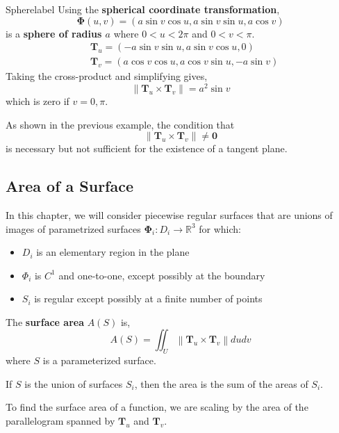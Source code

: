 \begin{ex}{Sphere}{label}
	Using the \textbf{spherical coordinate transformation},
	\[\mathbf{\Phi}(u, v) = (a \sin v \cos u, a \sin v \sin u, a \cos v)\]
	is a \textbf{sphere of radius $a$} where $0 < u < 2 \pi$ and $0 < v < \pi$.
	\begin{align*}
		&\mathbf{T}_u=(-a \sin v \sin u, a \sin v \cos u, 0) \\
		&\mathbf{T}_v=(a \cos v \cos u, a \cos v \sin u,-a \sin v)
	\end{align*}
	Taking the cross-product and simplifying gives,
	\[\|\mathbf{T}_u \times \mathbf{T}_v\| = a^2 \sin v\]
	which is zero if $v = 0, \pi$.
\end{ex}

\begin{rmk}
	As shown in the previous example, the condition that
	\[\|\mathbf{T}_u \times \mathbf{T}_v\| \neq \mathbf{0}\]
	is necessary but not sufficient for the existence of a tangent plane.
\end{rmk}

\subsection{Area of a Surface}
In this chapter, we will consider piecewise regular surfaces that are unions of images of parametrized surfaces $\boldsymbol{\Phi}_i: D_i \rightarrow \mathbb{R}^3$ for which:
\begin{itemize}
	\item $D_i$ is an elementary region in the plane
	\item $\Phi_i$ is $C^1$ and one-to-one, except possibly at the boundary
	\item $S_i$ is regular except possibly at a finite number of points
\end{itemize}

\begin{defn}
	The \textbf{surface area} $A(S)$ is,
	\[A(S) = \iint_U\left\|\mathbf{T}_u \times \mathbf{T}_v\right\| d u d v\]
	where $S$ is a parameterized surface.
\end{defn}

\begin{marginfigure}
	If $S$ is the union of surfaces $S_i$, then the area is the sum of the areas of $S_i$.
\end{marginfigure}

\begin{marginfigure}
	To find the surface area of a function, we are scaling by the area of the parallelogram spanned by $\mathbf{T}_u$ and $\mathbf{T}_v$.
\end{marginfigure}

